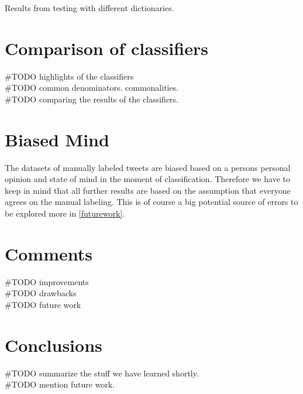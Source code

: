 Results from testing with different dictionaries. 

\section{Comparison of classifiers}
#TODO highlights of the classifiers \\
#TODO common denominators. commonalities.\\
#TODO comparing the results of the classifiers. \\

\section{Biased Mind}
The datasets of manually labeled tweets are biased based on a persons 
personal opinion and state of mind in the moment of classification.
Therefore we have to keep in mind that all further results are based on the
assumption that everyone agrees on the manual labeling. This is of course a big
potential source of errors to be explored more in \ref{futurework}. 

\section{Comments}
#TODO improvements \\
#TODO drawbacks \\
#TODO future work \\

\section{Conclusions}
#TODO summarize the stuff we have learned shortly. \\
#TODO mention future work. \\
